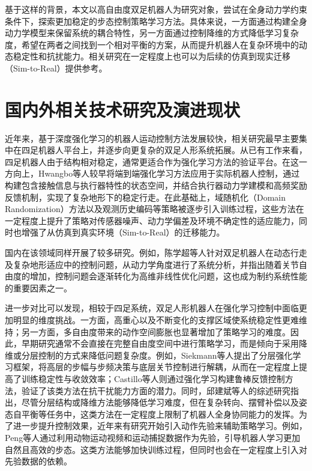 基于这样的背景，本文以高自由度双足机器人为研究对象，尝试在全身动力学约束条件下，探索更加稳定的步态控制策略学习方法。具体来说，一方面通过构建全身动力学模型来保留系统的耦合特性，另一方面通过控制降维的方式降低学习复杂度，希望在两者之间找到一个相对平衡的方案，从而提升机器人在复杂环境中的动态稳定性和抗扰能力。相关研究在一定程度上也可以为后续的仿真到现实迁移（Sim-to-Real）提供参考。

\section{国内外相关技术研究及演进现状}
近年来，基于深度强化学习的机器人运动控制方法发展较快，相关研究最早主要集中在四足机器人平台上，并逐步向更复杂的双足人形系统拓展。从已有工作来看，四足机器人由于结构相对稳定，通常更适合作为强化学习方法的验证平台。在这一方向上，Hwangbo等人\cite{Hwangbo2019}较早将端到端强化学习方法应用于实际机器人控制，通过构建包含接触信息与执行器特性的状态空间，并结合执行器动力学建模和高频奖励反馈机制，实现了复杂地形下的稳定行走。在此基础上，域随机化（Domain Randomization）方法\cite{Peng2018}以及观测历史编码等策略被逐步引入训练过程，这些方法在一定程度上提升了策略对传感器噪声、动力学偏差及环境不确定性的适应能力，同时也增强了从仿真到真实环境（Sim-to-Real）的迁移能力\cite{Kumar2021}。

国内在该领域同样开展了较多研究。例如，陈学超等人\cite{Chen2023}针对双足机器人在动态行走及复杂地形适应中的控制问题，从动力学角度进行了系统分析，并指出随着关节自由度的增加，控制问题会逐渐转化为高维非线性优化问题，这也成为制约系统性能的重要因素之一。

进一步对比可以发现，相较于四足系统，双足人形机器人在强化学习控制中面临更加明显的维度挑战。一方面，高重心以及不断变化的支撑区域使系统稳定性更难维持；另一方面，多自由度带来的动作空间膨胀也显著增加了策略学习的难度。因此，早期研究通常不会直接在完整自由度空间中进行策略学习，而是倾向于采用降维或分层控制的方式来降低问题复杂度。例如，Siekmann等人\cite{Siekmann2021}提出了分层强化学习框架，将高层的步幅与步频决策与底层关节控制进行解耦，从而在一定程度上提高了训练稳定性与收敛效率；Castillo等人\cite{Castillo2021}则通过强化学习构建鲁棒反馈控制方法，验证了该类方法在抗干扰能力方面的潜力。同时，邱建斌等人\cite{10}的综述研究指出，尽管分层结构或降维方法能够降低学习难度，但在复杂转向、摆臂补偿以及姿态自平衡等任务中，这类方法在一定程度上限制了机器人全身协同能力的发挥。为了进一步提升控制效果，近年来有研究开始引入动作先验来辅助策略学习。例如，Peng等人\cite{Peng2018}通过利用动物运动视频和运动捕捉数据作为先验，引导机器人学习更加自然且高效的步态。这类方法能够加快训练过程，但同时也会在一定程度上引入对先验数据的依赖。

